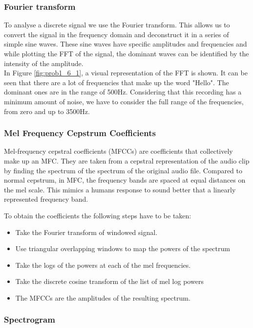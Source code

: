 \subsubsection{ Fourier transform}

To analyse a discrete signal we use the Fourier transform. 
This allows us to convert the signal in the frequency domain and deconstruct it in a series of simple sine waves. 
These sine waves have specific amplitudes and frequencies and while plotting the FFT of the signal, 
the dominant waves can be identified by the intensity of the amplitude.\\

In Figure \ref{fig:prob1_6_1}, a visual representation of the FFT is shown. 
It can be seen that there are a lot of frequencies that make up the word "Hello". 
The dominant ones are in the range of 500Hz. 
Considering that this recording has a minimum amount of noise,
we have to consider the full range of the frequencies,
from zero and up to 3500Hz.

\subsubsection{ Mel Frequency Cepstrum Coefficients}

Mel-frequency cepstral coefficients (MFCCs) are coefficients that collectively make up an MFC. 
They are taken from a cepstral representation of the audio clip by finding the spectrum of the spectrum of the original audio file.
 Compared to normal cepstrum, in MFC, the frequency bands are spaced at equal distances on the mel scale.
 This mimics a humans response to sound better that a linearly represented frequency band.

To obtain the coefficients the following steps have to be taken:
\begin{itemize}
	\item Take the Fourier transform of windowed signal.
	\item Use triangular overlapping windows to map the powers of the spectrum
	\item Take the logs of the powers at each of the mel frequencies.
	\item Take the discrete cosine transform of the list of mel log powers
	\item The MFCCs are the amplitudes of the resulting spectrum.

\end{itemize}


\subsubsection{ Spectrogram}

